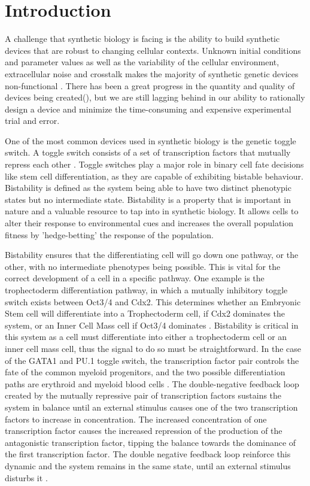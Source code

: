 \section{Introduction}

A challenge that synthetic biology is facing is the ability to build synthetic devices that are robust to changing cellular contexts. Unknown initial conditions and parameter values as well as the variability of the cellular environment, extracellular noise and crosstalk makes the majority of synthetic genetic devices non-functional \autocite{Chen:2009ea}. There has been a great progress in the  quantity and quality of devices being created(), but we are still lagging behind in our ability to rationally design a device and minimize the time-consuming and expensive experimental trial and error. 

One of the most common devices used in synthetic biology is the genetic toggle switch. A toggle switch consists of a set of transcription factors that mutually repress each other \autocite{Gardner:2000vha}. Toggle switches play a major role in binary cell fate decisions like stem cell differentiation, as they are capable of exhibiting bistable behaviour. Bistability is defined as the system being able to have two distinct phenotypic states but no intermediate state. Bistability is a property that is important in nature and a valuable resource to tap into in synthetic biology. It allows cells to alter their response to environmental cues and increases the overall population fitness by 'hedge-betting' the response of the population.

Bistability ensures that the differentiating cell will go down one pathway, or the other, with no intermediate phenotypes being possible. This is vital for the correct development of a cell in a specific pathway. One example is the trophectoderm differentiation pathway, in which a mutually inhibitory toggle switch exists between Oct3/4 and Cdx2. This determines whether an Embryonic Stem cell will differentiate into a Trophectoderm cell, if Cdx2 dominates the system, or an Inner Cell Mass cell if Oct3/4 dominates \autocite{Niwa:2005fz}. Bistability is critical in this system as a cell must differentiate into either a trophectoderm cell or an inner cell mass cell, thus the signal to do so must be straightforward. In the case of the GATA1 and PU.1 toggle switch, the transcription factor pair controls the fate of the common myeloid progenitors, and the two possible differentiation paths are erythroid and myeloid blood cells \autocite{Chickarmane:2009by}. The double-negative feedback loop created by the mutually repressive pair of transcription factors sustains the system in balance until an external stimulus causes one of the two transcription factors to increase in concentration. The increased concentration of one transcription factor causes the increased repression of the production of the antagonistic transcription factor, tipping the balance towards the dominance of the first transcription factor. The double negative feedback loop reinforce this dynamic and the system remains in the same state, until an external stimulus disturbs it \autocite{FerrellJr:2002fh}.

